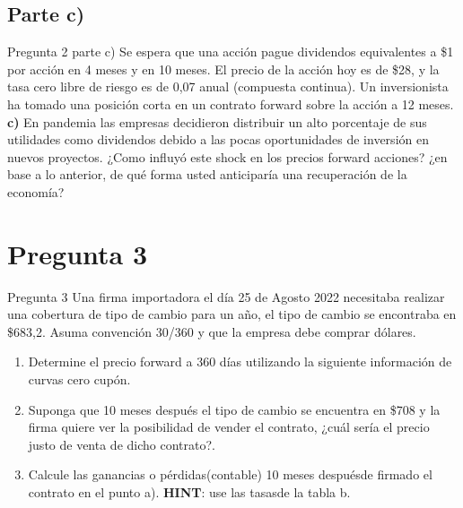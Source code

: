 \documentclass{beamer}
\begin{document}
\subsection{Parte c)}
\begin{frame}{Pregunta 2 parte c)}
  Se espera que una acción pague dividendos equivalentes a \$1 por acción en 4 meses y en 10 meses.
  El precio de la acción hoy es de \$28, y la tasa cero libre de riesgo es de 0,07 anual (compuesta continua).
  Un inversionista ha tomado una posición corta en un contrato forward sobre la acción a 12 meses.\\
  \textbf{c)} En pandemia las empresas decidieron distribuir un alto porcentaje de sus utilidades como dividendos 
  debido a las pocas oportunidades de inversión en nuevos proyectos. ¿Como influyó este shock en los precios 
  forward acciones? ¿en base a lo anterior, de qué forma usted anticiparía una recuperación de la economía?
\end{frame}

\section{Pregunta 3}
\begin{frame}{Pregunta 3}
  Una firma importadora el día 25 de Agosto 2022 necesitaba realizar una cobertura de tipo de cambio 
para un año, el tipo de cambio se encontraba en \$683,2. Asuma convención 30/360 y que la empresa debe comprar dólares.\\
  \begin{enumerate}[label=\textbf{\alph*)}]
    \item Determine el precio forward a 360 días utilizando la siguiente información de curvas cero cupón.

    \item	Suponga que 10 meses después el tipo de cambio se encuentra en \$708 y la firma quiere ver
    la posibilidad de vender el contrato, ¿cuál sería el precio justo de venta de dicho contrato?.

    \item Calcule las ganancias o pérdidas(contable) 10 meses despuésde firmado el contrato en el 
        punto a). \textbf{HINT}: use las tasasde la tabla b.
      \end{enumerate}
\end{frame}
\end{document}
